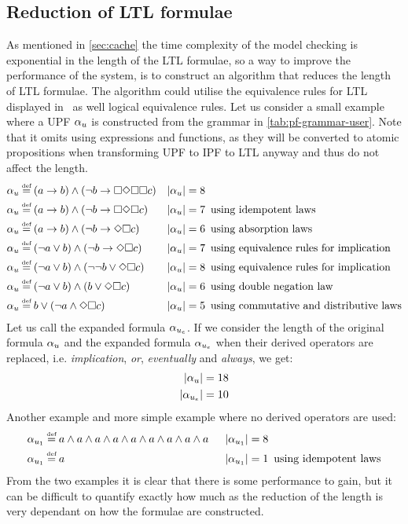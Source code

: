 \subsection{Reduction of LTL formulae}\label{sec:min-ltl}
As mentioned in \autoref{sec:cache} the time complexity of the model checking is exponential in the length of the LTL formulae, so a way to improve the performance of the system, is to construct an algorithm that reduces the length of LTL formulae. The algorithm could utilise the equivalence rules for LTL displayed in~\cite[Fig.~5.7]{baier2008principles} as well logical equivalence rules. Let us consider a small example where a UPF $\alpha_u$ is constructed from the grammar in \autoref{tab:pf-grammar-user}. Note that it omits using expressions and functions, as they will be converted to atomic propositions when transforming UPF to IPF to LTL anyway and thus do not affect the length.
\begin{align*}
    \pf_u &\eqdef (a \imply b) \land (\lnot b \imply \G\F\G\G c)     &|\upf| = 8 & \\
    \pf_u &\eqdef (a \imply b) \land (\lnot b \imply \G\F\G c)       &|\upf| = 7 &\enskip \text{using idempotent laws} \\
    \pf_u &\eqdef (a \imply b) \land (\lnot b \imply \F\G c)         &|\upf| = 6 &\enskip \text{using absorption laws} \\
    \pf_u &\eqdef (\lnot a \lor b) \land (\lnot b \imply \F\G c)     &|\upf| = 7 &\enskip \text{using equivalence rules for implication} \\
    \pf_u &\eqdef (\lnot a \lor b) \land (\lnot \lnot b \lor \F\G c) &|\upf| = 8 &\enskip \text{using equivalence rules for implication} \\
    \pf_u &\eqdef (\lnot a \lor b) \land (b \lor \F\G c)             &|\upf| = 6 &\enskip \text{using double negation law} \\
    \pf_u &\eqdef b \lor (\lnot a \land \F\G c)                      &|\upf| = 5 &\enskip \text{using commutative and distributive laws}
\end{align*}
Let us call the expanded formula $\alpha_{u_e}$. If we consider the length of the original formula $\alpha_u$ and the expanded formula $\alpha_{u_e}$ when their derived operators are replaced, i.e. \emph{implication}, \emph{or}, \emph{eventually} and \emph{always}, we get:
\begin{align}
    |\alpha_u| = 18 \\
    |\alpha_{u_e}| = 10
\end{align}
Another example and more simple example where no derived operators are used:
\begin{align*}
    \pf_{u_1} &\eqdef a \land a \land a \land a \land a \land a \land a \land a \land a \enskip &|\pf_{u_1}| = 8 & \\
    \pf_{u_1} &\eqdef a                                                                 \enskip &|\pf_{u_1}| = 1 &\enskip \text{using idempotent laws}
\end{align*}
From the two examples it is clear that there is some performance to gain, but it can be difficult to quantify exactly how much as the reduction of the length is very dependant on how the formulae are constructed.

